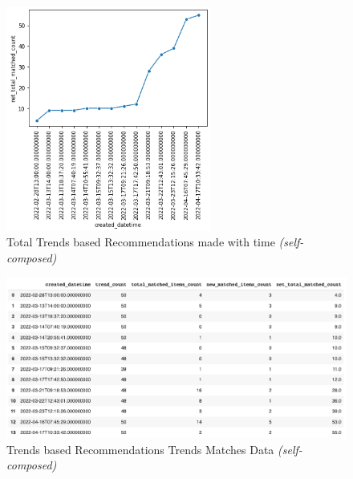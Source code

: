 \begin{figure}[h!]
\centering
\includegraphics[width=0.6\textwidth]{images/Testing/trends/trends-matches-eval2.png}
\caption{Total Trends based Recommendations made with time \textit{(self-composed)}}
\label{fig:trends-recsys-total-matches}
\end{figure}

\begin{figure}[h!]
\centering
\includegraphics[width=\textwidth]{images/Testing/trends/trend-match-count-data.png}
\caption{Trends based Recommendations Trends Matches Data \textit{(self-composed)}}
\label{fig:trends-recsys-trends-matches-data}
\end{figure}

